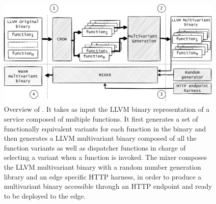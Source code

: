 \begin{figure}
  \centering
  \includegraphics[width=0.8\linewidth]{diagrams/Fastly2.0.drawio.pdf}
  \caption{Overview of \tool. It takes as input the LLVM binary representation of a service composed of multiple functions. It first generates a set of functionally equivalent variants for each function in the binary and then generates a LLVM multivariant binary composed of all the function variants as well as dispatcher functions in charge of selecting a variant when a function is invoked. The \tool mixer composes the LLVM multivariant binary with a random number generation library and an edge specific HTTP harness, in order to produce a \wasm multivariant binary accessible through an HTTP endpoint and ready to be deployed to the edge. }
  \label{workflow}
\end{figure}




